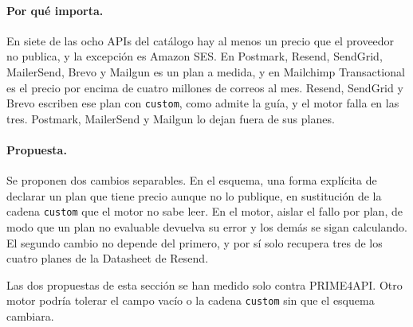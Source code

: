 \paragraph{Por qué importa.}
En siete de las ocho APIs del catálogo hay al menos un precio que el proveedor no publica, y la excepción es Amazon SES.
En Postmark, Resend, SendGrid, MailerSend, Brevo y Mailgun es un plan a medida, y en Mailchimp Transactional es el precio por encima de cuatro millones de correos al mes.
Resend, SendGrid y Brevo escriben ese plan con \texttt{custom}, como admite la guía, y el motor falla en las tres.
Postmark, MailerSend y Mailgun lo dejan fuera de sus planes.

\paragraph{Propuesta.}
Se proponen dos cambios separables.
En el esquema, una forma explícita de declarar un plan que tiene precio aunque no lo publique, en sustitución de la cadena \texttt{custom} que el motor no sabe leer.
En el motor, aislar el fallo por plan, de modo que un plan no evaluable devuelva su error y los demás se sigan calculando.
El segundo cambio no depende del primero, y por sí solo recupera tres de los cuatro planes de la Datasheet de Resend.

Las dos propuestas de esta sección se han medido solo contra PRIME4API.
Otro motor podría tolerar el campo vacío o la cadena \texttt{custom} sin que el esquema cambiara.
